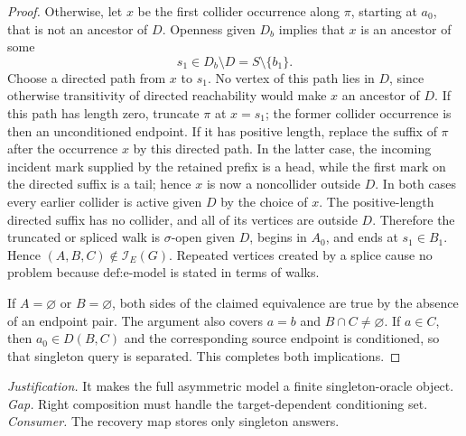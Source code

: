 \documentclass{article}
\begin{document}
\begin{proof}
Otherwise, let \(x\) be the first collider occurrence along \(\pi\), starting at \(a_0\), that is not an ancestor of \(D\).  Openness given \(D_b\) implies that \(x\) is an ancestor of some
\[
s_1\in D_b\setminus D=S\setminus\{b_1\}.
\]
Choose a directed path from \(x\) to \(s_1\).  No vertex of this path lies in \(D\), since otherwise transitivity of directed reachability would make \(x\) an ancestor of \(D\).  If this path has length zero, truncate \(\pi\) at \(x=s_1\); the former collider occurrence is then an unconditioned endpoint.  If it has positive length, replace the suffix of \(\pi\) after the occurrence \(x\) by this directed path.  In the latter case, the incoming incident mark supplied by the retained prefix is a head, while the first mark on the directed suffix is a tail; hence \(x\) is now a noncollider outside \(D\).  In both cases every earlier collider is active given \(D\) by the choice of \(x\).  The positive-length directed suffix has no collider, and all of its vertices are outside \(D\).  Therefore the truncated or spliced walk is \(\sigma\)-open given \(D\), begins in \(A_0\), and ends at \(s_1\in B_1\).  Hence \((A,B,C)\notin\mathcal I_E(G)\).  Repeated vertices created by a splice cause no problem because \(\text{def:e-model}\) is stated in terms of walks.

If \(A=\varnothing\) or \(B=\varnothing\), both sides of the claimed equivalence are true by the absence of an endpoint pair.  The argument also covers \(a=b\) and \(B\cap C\ne\varnothing\).  If \(a\in C\), then \(a_0\in D(B,C)\) and the corresponding source endpoint is conditioned, so that singleton query is separated.  This completes both implications.
\end{proof}
\par\smallskip\noindent \textit{Justification.} It makes the full asymmetric model a finite singleton-oracle object. \textit{Gap.} Right composition must handle the target-dependent conditioning set. \textit{Consumer.} The recovery map stores only singleton answers.
\end{document}
